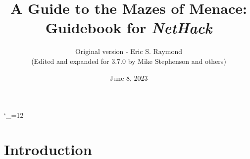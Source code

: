 \textheight 220mm
\textwidth 160mm
\oddsidemargin 0mm
\evensidemargin 0mm
\topmargin 0mm

\newcommand{\nd}{\noindent}

\newcommand{\tb}[1]{\tt #1 \hfill}
\newcommand{\bb}[1]{\bf #1 \hfill}
\newcommand{\ib}[1]{\it #1 \hfill}

\newcommand{\blist}[1]
{\begin{list}{$\bullet$}
    {\leftmargin 30mm \topsep 2mm \partopsep 0mm \parsep 0mm \itemsep 1mm
     \labelwidth 28mm \labelsep 2mm
     #1}}

\newcommand{\elist}{\end{list}}

\catcode`\_=12


%
%

\title{\LARGE A Guide to the Mazes of Menace:\\
\Large Guidebook for {\it NetHack\/}}

\author{Original version - Eric S. Raymond\\
(Edited and expanded for 3.7.0 by Mike Stephenson and others)}
\date{June 8, 2023}

\maketitle

\section{Introduction}


